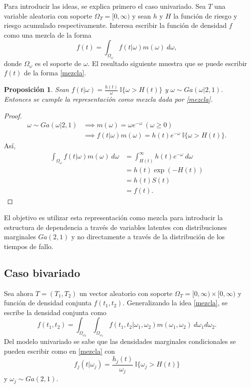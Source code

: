 \documentclass[11pt,a4paper]{article}
\newtheorem{proposition}{Proposición}[subsection]
\begin{document}
Para introducir las ideas, se explica primero el caso univariado. Sea $T$ una variable aleatoria con soporte $\Omega_T = [0, \infty)$ y sean $h$ y $H$ la función de riesgo y riesgo acumulado respectivamente. Interesa escribir la función de densidad $f$ como una mezcla de la forma
\begin{equation} \label{mezcla}
f(t) = \int_{\Omega_\omega} f(t|\omega)m(\omega) \ d\omega,
\end{equation}
donde $\Omega_\omega$ es el soporte de $\omega$. El resultado siguiente muestra que se puede escribir $f(t)$ de la forma \eqref{mezcla}.
\begin{proposition}
Sean $f(t|\omega) = \frac{h(t)}{\omega} \ \mathbb{I}\lbrace\omega > H(t)\rbrace$ y $\omega\sim Ga(\omega | 2, 1)$. Entonces se cumple la representación como mezcla dada por \eqref{mezcla}.
\end{proposition}
\begin{proof}
\begin{align*}
\omega \sim Ga(\omega | 2, 1) &\implies m(\omega) = \omega e^{-\omega} \ (\omega\geq 0)\\
&\implies f(t|\omega)m(\omega) = h(t)e^{-\omega} \ \mathbb{I}\lbrace\omega > H(t)\rbrace.
\end{align*}
Así,
\begin{align*}
\int_{\Omega_\omega} f(t|\omega)m(\omega) \ d\omega &= \int_{H(t)}^\infty h(t)e^{-\omega} \ d\omega\\
&= h(t) \exp(-H(t))\\
&= h(t)S(t)\\
&= f(t).
\end{align*}
\end{proof}

El objetivo es utilizar esta representación como mezcla para introducir la estructura de dependencia a través de variables latentes con distribuciones marginales $Ga(2, 1)$ y no directamente a través de la distribución de los tiempos de fallo.

\subsection{Caso bivariado} \label{caso_bivariado}
Sea ahora $T=(T_1, T_2)$ un vector aleatorio con soporte $\Omega_T = [0, \infty) \times [0, \infty)$ y función de densidad conjunta $f(t_1, t_2)$. Generalizando la idea \eqref{mezcla}, se escribe la densidad conjunta como
\begin{equation} \label{mezcla_conjunta}
f(t_1, t_2) =\int_{\Omega_{\omega_2}}\int_{\Omega_{\omega_1}} f(t_1, t_2 | \omega_1, \omega_2)m(\omega_1, \omega_2) \ d\omega_1 d\omega_2.
\end{equation}
Del modelo univariado se sabe que las densidades marginales condicionales se pueden escribir como en \eqref{mezcla} con
\begin{equation} \label{marginal}
f_j(t|\omega_j) = \frac{h_j(t)}{\omega_j} \ \mathbb{I}\lbrace\omega_j > H(t)\rbrace
\end{equation}
y $\omega_j \sim Ga(2, 1)$.
\end{document}
